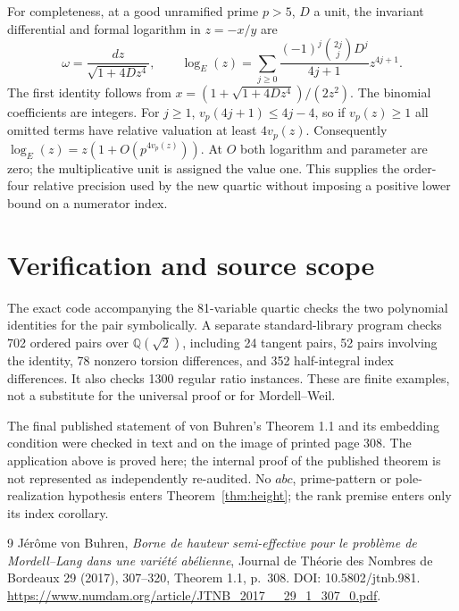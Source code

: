 \documentclass[11pt,a4paper]{article}
\newcommand{\Q}{\mathbb Q}\newcommand{\Z}{\mathbb Z}\DeclareMathOperator{\Tr}{Tr}
\begin{document}
For completeness, at a good unramified prime $p>5$, $D$ a unit, the
invariant differential and formal logarithm in $z=-x/y$ are
\[
 \omega=\frac{dz}{\sqrt{1+4Dz^4}},\qquad
 \log_E(z)=\sum_{j\ge0}\frac{(-1)^j\binom{2j}{j}D^j}{4j+1}z^{4j+1}.
\]
The first identity follows from
$x=(1+\sqrt{1+4Dz^4})/(2z^2)$. The binomial coefficients are integers.
For $j\ge1$, $v_p(4j+1)\le4j-4$, so if $v_p(z)\ge1$ all omitted
terms have relative valuation at least $4v_p(z)$. Consequently
$\log_E(z)=z(1+O(p^{4v_p(z)}))$. At $O$ both logarithm and parameter
are zero; the multiplicative unit is assigned the value one.
This supplies the order-four relative precision used by the new
quartic without imposing a positive lower bound on a numerator index.

\section{Verification and source scope}
The exact code accompanying the 81-variable quartic checks the two
polynomial identities for the pair symbolically. A separate
standard-library program checks 702 ordered pairs over $\Q(\sqrt2)$,
including 24 tangent pairs, 52 pairs involving the identity, 78
nonzero torsion differences, and 352 half-integral index differences.
It also checks 1300 regular ratio instances. These are finite examples,
not a substitute for the universal proof or for Mordell--Weil.

The final published statement of von Buhren's Theorem 1.1 and its
embedding condition were checked in text and on the image of printed
page 308. The application above is proved here; the internal proof of
the published theorem is not represented as independently re-audited.
No $abc$, prime-pattern or pole-realization hypothesis enters
Theorem~\ref{thm:height}; the rank premise enters only its index
corollary.

\begin{thebibliography}{9}
 J\'er\^ome von Buhren, \emph{Borne de hauteur semi-effective
pour le probl\`eme de Mordell--Lang dans une vari\'et\'e ab\'elienne},
Journal de Th\'eorie des Nombres de Bordeaux 29 (2017), 307--320,
Theorem 1.1, p.~308. DOI: 10.5802/jtnb.981.
\url{https://www.numdam.org/article/JTNB_2017__29_1_307_0.pdf}.
\end{thebibliography}
\end{document}
